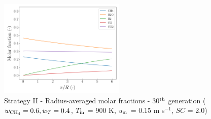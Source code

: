 \documentclass[preprint,12pt]{elsarticle}
\begin{document}
\begin{figure}[h!]
\centering
\includegraphics[width=60mm]{results/5Eq/60C_40T/GEN30-AVG.png}
\caption{\label{fig:5RES6040G30-avg} Strategy II - Radius-averaged molar fractions -  30$^{\rm{th}}$ generation ($w_{\rm{CH_4}} = 0.6, w_T = 0.4$, $T_{\rm{in}}$ = 900 K, $u_{\rm{in}}$ = 0.15 m s$^{-1}$, $SC$ = 2.0)}
\end{figure}
\end{document}
